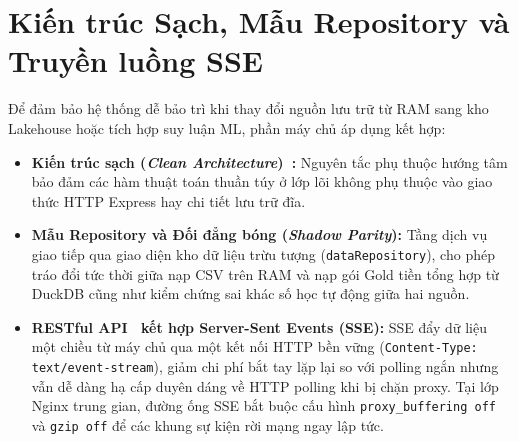 \section{Kiến trúc Sạch, Mẫu Repository và Truyền luồng SSE}
\label{sec:bg-arch}
Để đảm bảo hệ thống dễ bảo trì khi thay đổi nguồn lưu trữ từ RAM sang kho Lakehouse hoặc tích hợp suy luận ML, phần máy chủ áp dụng kết hợp:
\begin{itemize}[topsep=0pt, itemsep=1pt]
	\item \textbf{Kiến trúc sạch (\textit{Clean Architecture})~\cite{martin2017clean}:} Nguyên tắc phụ thuộc hướng tâm bảo đảm các hàm thuật toán thuần túy ở lớp lõi không phụ thuộc vào giao thức HTTP Express hay chi tiết lưu trữ đĩa.
	\item \textbf{Mẫu Repository và Đối đẳng bóng (\textit{Shadow Parity}):} Tầng dịch vụ giao tiếp qua giao diện kho dữ liệu trừu tượng (\texttt{dataRepository}), cho phép tráo đổi tức thời giữa nạp CSV trên RAM và nạp gói Gold tiền tổng hợp từ DuckDB cũng như kiểm chứng sai khác số học tự động giữa hai nguồn.
	\item \textbf{RESTful API~\cite{fielding2000rest} kết hợp Server-Sent Events (SSE):} SSE đẩy dữ liệu một chiều từ máy chủ qua một kết nối HTTP bền vững (\texttt{Content-Type: text/event-stream}), giảm chi phí bắt tay lặp lại so với polling ngắn nhưng vẫn dễ dàng hạ cấp duyên dáng về HTTP polling khi bị chặn proxy. Tại lớp Nginx trung gian, đường ống SSE bắt buộc cấu hình \texttt{proxy_buffering off} và \texttt{gzip off} để các khung sự kiện rời mạng ngay lập tức.
\end{itemize}